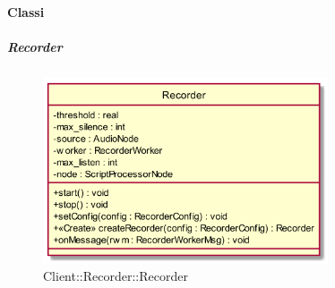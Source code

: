 \paragraph{Classi}
\hypertarget{Recorder_label}{\subparagraph{Recorder}}
\begin{figure}[h]
	\centering
	\includegraphics[width=0.75\textwidth,height=\textheight,keepaspectratio]{images/ClassRecorder.png}
	\caption{Client::Recorder::Recorder}
\end{figure}
